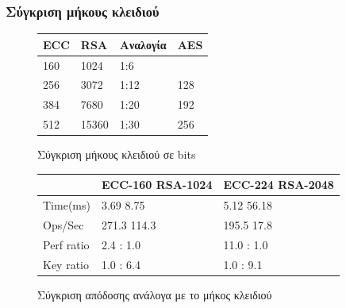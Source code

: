 \documentclass{beamer}
\begin{document}
%
\begin{frame}
\frametitle{Σύγκριση μήκους κλειδιού}
\begin{figure}
\begin{center}
\begin{tabular}{|l|l|l|l|} \hline
\textbf{ECC} & \textbf{RSA} & \textbf{Αναλογία} & \textbf{AES} \\ \hline
160 & 1024 & 1:6 & \\ \hline
256 & 3072 & 1:12 & 128 \\ \hline
384 & 7680 & 1:20 & 192 \\ \hline
512 & 15360 & 1:30 & 256 \\ \hline
\end{tabular}
\end{center}
\caption{Σύγκριση μήκους κλειδιού σε bits}
\end{figure}

\begin{figure}
\begin{center}
\begin{small}
\begin{tabular}{|l|l|l|} \hline
& \textbf{ECC-160 \hspace{1em} RSA-1024} & \textbf{ECC-224 \hspace{1em} RSA-2048}\\ \hline
Time(ms) & \hspace{1em} 3.69 \hspace{4.5em} 8.75 & \hspace{1em} 5.12 \hspace{4.5em} 56.18 \\ \hline
Ops/Sec  & \hspace{1em} 271.3 \hspace{4em} 114.3 & \hspace{1em} 195.5 \hspace{4.3em} 17.8 \\ \hline
Perf ratio  & \hspace{3.5em} 2.4 : 1.0 & \hspace{3.5em} 11.0 : 1.0 \\ \hline
Key ratio  & \hspace{3.5em} 1.0 : 6.4 & \hspace{3.5em} 1.0 : 9.1 \\ \hline
\end{tabular}
\end{small}
\end{center}
\caption{Σύγκριση απόδοσης ανάλογα με το μήκος κλειδιού \cite{SUN}}
\end{figure}

\end{frame}
\end{document}
